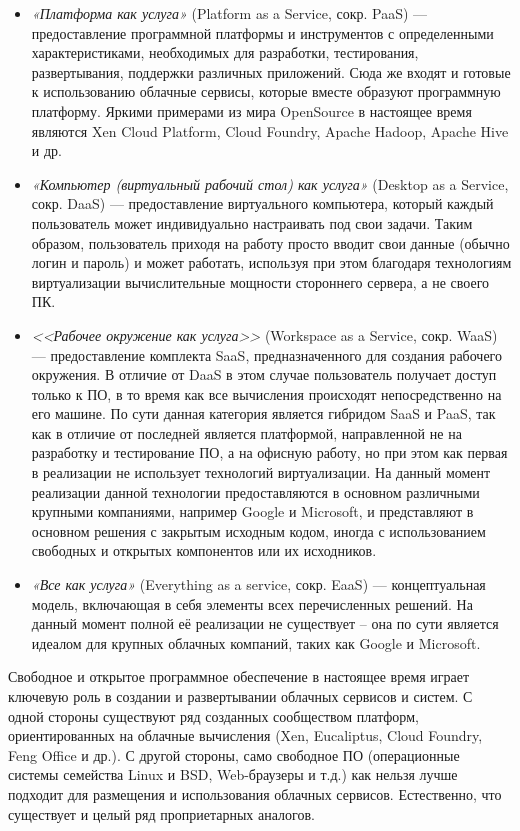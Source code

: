 \documentclass[a5paper,10pt]{article}
\begin{document}
\begin{itemize}
\item \emph{«Платформа как услуга»} (Platform as a Service, сокр. PaaS) --- предоставление программной платформы и инструментов с определенными характеристиками, необходимых для разработки, тестирования, развертывания, поддержки различных приложений. Сюда же входят и готовые к использованию облачные сервисы, которые вместе образуют программную платформу. Яркими примерами из мира OpenSource в настоящее время являются Xen Cloud Platform, Cloud Foundry, Apache Hadoop, Apache Hive и др.
\item \emph{«Компьютер (виртуальный рабочий стол) как услуга»} (Desktop as a Service, сокр. DaaS) --- предоставление виртуального компьютера, который каждый пользователь может индивидуально настраивать под свои задачи. Таким образом, пользователь приходя на работу просто вводит свои данные (обычно логин и пароль) и может работать, используя при этом благодаря технологиям виртуализации вычислительные мощности стороннего сервера, а не своего ПК. 
\item \emph{<<Рабочее окружение как услуга>>} (Workspace as a Service, сокр. WaaS) --- предоставление комплекта  SaaS, предназначенного для создания рабочего окружения. В отличие от DaaS в этом случае пользователь получает доступ только к ПО, в то время как все вычисления происходят непосредственно на его машине. По сути данная категория является гибридом SaaS и PaaS, так как в отличие от последней является платформой, направленной не на разработку и тестирование ПО, а на офисную работу, но при этом как первая в реализации не использует технологий виртуализации. На данный момент реализации данной технологии предоставляются в основном различными крупными компаниями, например Google и Microsoft, и представляют в основном решения с закрытым исходным кодом, иногда с использованием свободных и открытых компонентов или их исходников.
\item \emph{«Все как услуга»} (Everything as a service, сокр. EaaS) --- концептуальная модель, включающая в себя элементы всех перечисленных решений. На данный момент полной её реализации не существует -- она по сути является идеалом для крупных облачных компаний, таких как Google и Microsoft.
\end{itemize}

Свободное и открытое программное обеспечение в настоящее время играет ключевую роль в создании и развертывании облачных сервисов и систем. С одной стороны существуют ряд созданных сообществом платформ, ориентированных на облачные вычисления (Xen, Eucaliptus, Cloud Foundry, Feng Office и др.). С другой стороны, само свободное ПО (операционные системы семейства Linux и BSD, Web-браузеры и т.д.) как нельзя лучше подходит для размещения и использования облачных сервисов.  Естественно, что существует и целый ряд проприетарных аналогов. 
\end{document}
